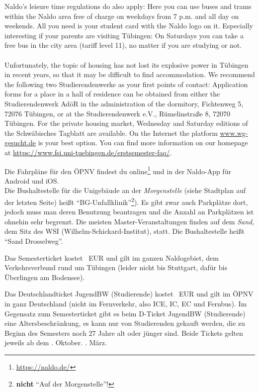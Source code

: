     Naldo's leisure time regulations do also apply: Here you can use buses and trams within the Naldo area free of charge on weekdays from 7 p.m. and all day on weekends. All you need is your student card with the Naldo logo on it.
    Especially interesting if your parents are visiting Tübingen: On Saturdays you can take a free bus in the city area (tariff level 11), no matter if you are studying or not.\\ \\

    Unfortunately, the topic of housing has not lost its explosive power in Tübingen in recent years,
    so that it may be difficult to find accommodation. We recommend the following two Studierendenwerke as your first points of contact:
    Application forms for a place in a hall of residence can be obtained from either the Studierendenwerk AdöR in the administration of the dormitory,
    Fichtenweg 5, 72076 Tübingen, or at the Studierendenwerk e.V., Rümelinstraße 8, 72070 Tübingen. For the private housing market, Wednesday and Saturday
    editions of the Schwäbisches Tagblatt are available.
    On the Internet the platform \url{www.wg-gesucht.de} is your best option.
    You can find more information on our homepage at \url{https://www.fsi.uni-tuebingen.de/erstsemester-faq/}.

\else

    Die Fahrpläne für den ÖPNV  findest du online\footnote{\url{https://naldo.de/}} und in der Naldo-App für Android und iOS.\\
    Die Bushaltestelle für die Unigebäude an der \emph{Morgenstelle} (siehe Stadtplan auf der letzten Seite) heißt "`BG-Unfallklinik"'\footnote{\textbf{nicht} "`Auf der Morgenstelle"'!}). Es gibt zwar auch Parkplätze dort,
    jedoch muss man deren Benutzung beantragen und die Anzahl an Parkplätzen ist ohnehin sehr begrenzt.
    \ifmaster
    Die meisten Master-Veranstaltungen finden auf dem \emph{Sand}, dem Sitz des WSI (Wilhelm-Schickard-Institut), statt. Die Bushaltestelle heißt "`Sand Drosselweg"'.
    \fi
    
    Das Semesterticket kostet \semesterticketpreis~EUR und gilt im ganzen Naldogebiet, dem Verkehrsverbund rund um Tübingen (leider nicht bis Stuttgart, dafür bis Überlingen am Bodensee).
    
    Das Deutschlandticket JugendBW (Studierende) kostet \jugendticketbwpreis~EUR und gilt im ÖPNV in ganz Deutschland (nicht im Fernverkehr, also ICE, IC, EC und Fernbus). Im Gegensatz zum Semesterticket gibt es beim D-Ticket JugendBW (Studierende) eine Altersbeschränkung,
    es kann nur von Studierenden gekauft werden, die zu Beginn des Semesters noch 27 Jahre alt oder jünger sind.
    Beide Tickets gelten jeweils ab dem
    . Oktober.
    \fi
    . März.
    \fi

